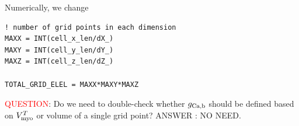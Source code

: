 Numerically, we change
\begin{verbatim}
! number of grid points in each dimension
MAXX = INT(cell_x_len/dX_)
MAXY = INT(cell_y_len/dY_)
MAXZ = INT(cell_z_len/dZ_)

TOTAL_GRID_ELEL = MAXX*MAXY*MAXZ
\end{verbatim}

% 

\textcolor{red}{QUESTION}: Do we need to double-check whether $g_{\text{Ca,b}}$ should be
defined based on $V_{\text{myo}}^T$ or volume of a single grid point? ANSWER : NO NEED. 
% 
% 


% 
% 
% 

